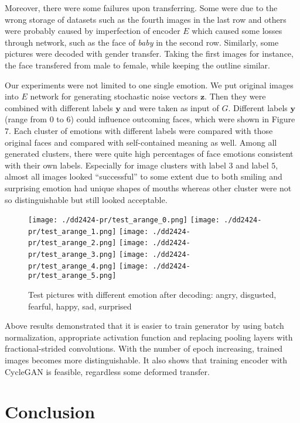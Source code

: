 \documentclass[runningheads]{llncs}
\begin{document}
Moreover, there were some failures upon transferring. Some were due to the wrong storage of datasets such as the fourth images in the last row and others were probably caused by imperfection of encoder $E$ which caused some losses through network, such as the face of \textit{baby} in the second row. Similarly, some pictures were decoded with gender transfer. Taking the first images for instance, the face transfered from male to female, while keeping the outline similar.

Our experiments were not limited to one single emotion. We put original images into $E$ network for generating stochastic noise vectors $\mathbf{z}$. Then they were combined with different labels $\mathbf{y}$ and were taken as input of $G$. Different labels $\mathbf{y}$ (range from $0$ to $6$) could influence outcoming faces, which were shown in Figure $7$. Each cluster of emotions with different labels were compared with those original faces and compared with self-contained meaning as well. Among all generated clusters, there were quite high percentages of face emotions consistent with their own labels. Especially for image clusters with label $3$ and label $5$, almost all images looked ``successful'' to some extent due to both smiling and surprising emotion had unique shapes of mouths whereas other cluster were not so distinguishable but still looked acceptable. 

\begin{figure}
\begin{center}
\texttt{[image: ./dd2424-pr/test\_arange\_0.png]}
\texttt{[image: ./dd2424-pr/test\_arange\_1.png]}
\texttt{[image: ./dd2424-pr/test\_arange\_2.png]}
\texttt{[image: ./dd2424-pr/test\_arange\_3.png]}
\texttt{[image: ./dd2424-pr/test\_arange\_4.png]}
\texttt{[image: ./dd2424-pr/test\_arange\_5.png]}
\caption{Test pictures with different emotion after decoding: angry, disgusted, fearful, happy, sad, surprised }
\end{center}
\end{figure}

Above results demonstrated that it is easier to train generator by using batch normalization, appropriate activation function and replacing pooling layers with fractional-strided convolutions. With the number of epoch increasing, trained images becomes more distinguishable. It also shows that training encoder with CycleGAN is feasible, regardless some deformed transfer.

\section{Conclusion}
\end{document}
